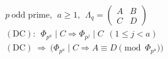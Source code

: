 \documentclass{article}
\begin{document}
\[
\begin{aligned}
&p\ \text{odd prime},\ \ a\ge1,\ \ \Lambda_q=\begin{pmatrix}A&B\\ C&D\end{pmatrix}\\
&(\mathrm{DC}):\ \ \Phi_{p^{a}}\mid C\Rightarrow\Phi_{p^{j}}\mid C\ \ (1\le j<a)\\
&(\mathrm{DC})\ \Longrightarrow\ \bigl(\Phi_{p^{a}}\mid C\Rightarrow A\equiv D\pmod{\Phi_{p^{a}}}\bigr)
\end{aligned}
\]
\end{document}
